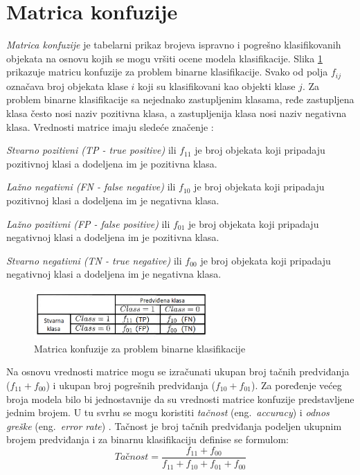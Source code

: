 \documentclass[12pt,oneside]{memoir}
\begin{document}
\section{Matrica konfuzije}

\textit{Matrica konfuzije} je tabelarni prikaz brojeva ispravno i pogrešno klasifikovanih objekata na osnovu kojih se mogu vršiti ocene modela klasifikacije. Slika \ref{fig:matrkonf} prikazuje matricu konfuzije za problem binarne klasifikacije. Svako od polja $f_{ij}$ označava broj objekata klase $i$ koji su klasifikovani kao objekti klase $j$. Za problem binarne klasifikacije sa nejednako zastupljenim klasama, ređe zastupljena klasa često nosi naziv pozitivna klasa, a zastupljenija klasa nosi naziv negativna klasa. Vrednosti matrice imaju sledeće značenje \cite{mitic}:

\textit{Stvarno pozitivni (TP - true positive)} ili $f_{11}$ je broj objekata koji pripadaju pozitivnoj klasi a dodeljena im je pozitivna klasa.

\textit{Lažno negativni (FN - false negative)} ili $f_{10}$ je broj objekata koji pripadaju pozitivnoj klasi a dodeljena im je negativna klasa.

\textit{Lažno pozitivni (FP - false positive)} ili $f_{01}$ je broj objekata koji pripadaju negativnoj klasi a dodeljena im je pozitivna klasa.

\textit{Stvarno negativni (TN - true negative)} ili $f_{00}$ je broj objekata koji pripadaju negativnoj klasi a dodeljena im je negativna klasa.

\begin{figure}[!ht]
  \centering
  \includegraphics[width=0.60\textwidth]{matrica_konfuzije}
  \caption{Matrica konfuzije za problem binarne klasifikacije}
  \label{fig:matrkonf}
\end{figure}

Na osnovu vrednosti matrice mogu se izračunati ukupan broj tačnih predviđanja ($f_{11}+f_{00}$) i ukupan broj pogrešnih predviđanja ($f_{10}+f_{01}$). Za poređenje većeg broja modela bilo bi jednostavnije da su vrednosti matrice konfuzije predstavljene jednim brojem. U tu svrhu se mogu koristiti \textit{tačnost} (eng.~\textit{accuracy})  i \textit{odnos greške} (eng.~\textit{error rate}) \cite{mitic}. Tačnost je broj tačnih predviđanja podeljen ukupnim brojem predviđanja i za binarnu klasifikaciju definise se formulom: 
$$ \textit{Tačnost} = \frac{f_{11}+f_{00}}{f_{11}+f_{10}+f_{01}+f_{00}} $$
\end{document}
